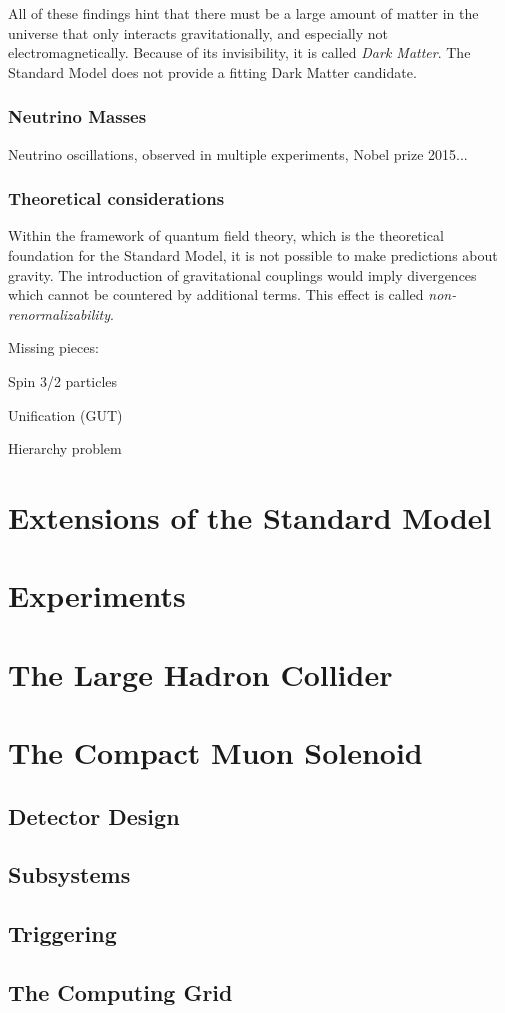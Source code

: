 All of these findings hint that there must be a large amount of matter in the universe that only interacts gravitationally, and especially not electromagnetically. Because of its invisibility, it is called \emph{Dark Matter}.
The Standard Model does not provide a fitting Dark Matter candidate.

\subsubsection{Neutrino Masses}
Neutrino oscillations, observed in multiple experiments, Nobel prize 2015...
\cite{KamLAND:ReactorAntineutrinoMeasurement,DoubleChooz:Improvedmeasurementsneutrino,IceCube:Determiningneutrinooscillation,DayaBay:NewMeasurementAntineutrino}

\subsubsection{Theoretical considerations}

Within the framework of quantum field theory, which is the theoretical foundation for the Standard Model, it is not possible to make predictions about gravity. The introduction of gravitational couplings would imply divergences which cannot be countered by additional terms. This effect is called \emph{non-renormalizability}.

Missing pieces: 

Spin 3/2 particles

Unification (GUT)

Hierarchy problem



\section{Extensions of the Standard Model}

\section{Experiments}

\section{The Large Hadron Collider}

\section{The Compact Muon Solenoid}
\subsection{Detector Design}
\subsection{Subsystems}
\subsection{Triggering}
\subsection{The Computing Grid}